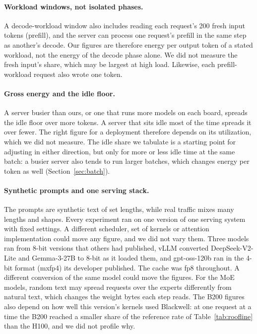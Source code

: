 \documentclass[11pt]{article}
\begin{document}
\paragraph{Workload windows, not isolated phases.} A decode-workload window also includes reading each request's 200 fresh input tokens (prefill), and the server can process one request's prefill in the same step as another's decode. Our figures are therefore energy per output token of a stated workload, not the energy of the decode phase alone. We did not measure the fresh input's share, which may be largest at high load. Likewise, each prefill-workload request also wrote one token.

\paragraph{Gross energy and the idle floor.} A server busier than ours, or one that runs more models on each board, spreads the idle floor over more tokens. A server that sits idle most of the time spreads it over fewer. The right figure for a deployment therefore depends on its utilization, which we did not measure. The idle share we tabulate is a starting point for adjusting in either direction, but only for more or less idle time at the same batch: a busier server also tends to run larger batches, which changes energy per token as well (Section~\ref{sec:batch}).

\paragraph{Synthetic prompts and one serving stack.} The prompts are synthetic text of set lengths, while real traffic mixes many lengths and shapes. Every experiment ran on one version of one serving system with fixed settings. A different scheduler, set of kernels or attention implementation could move any figure, and we did not vary them. Three models ran from 8-bit versions that others had published, vLLM converted DeepSeek-V2-Lite and Gemma-3-27B to 8-bit as it loaded them, and gpt-oss-120b ran in the 4-bit format (mxfp4) its developer published. The cache was fp8 throughout. A different conversion of the same model could move the figures. For the MoE models, random text may spread requests over the experts differently from natural text, which changes the weight bytes each step reads. The B200 figures also depend on how well this version's kernels used Blackwell: at one request at a time the B200 reached a smaller share of the reference rate of Table~\ref{tab:roofline} than the H100, and we did not profile why.
\end{document}
